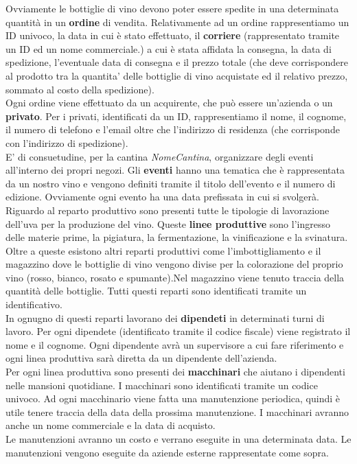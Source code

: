 Ovviamente le bottiglie di vino devono poter essere spedite in una determinata quantità in un \textbf{ordine} di vendita. Relativamente ad un ordine rappresentiamo un ID univoco, la data in cui è stato effettuato, il \textbf{corriere} (rappresentato tramite un ID ed un nome commerciale.) a cui è stata affidata la consegna, la data di spedizione, l'eventuale data di consegna e il prezzo totale (che deve corrispondere al prodotto tra la quantita' delle bottiglie di vino acquistate ed il relativo prezzo, sommato al costo della spedizione).\\
Ogni ordine viene effettuato da un acquirente, che può essere un'azienda o un \textbf{privato}. Per i privati, identificati da un ID, rappresentiamo il nome, il cognome, il numero di telefono e l'email oltre che l'indirizzo di residenza (che corrisponde con l'indirizzo di spedizione).\\
E' di consuetudine, per la cantina \emph{NomeCantina}, organizzare degli eventi all'interno dei propri negozi. Gli \textbf{eventi} hanno una tematica che è rappresentata da un nostro vino e vengono definiti tramite il titolo dell'evento e il numero di edizione. Ovviamente ogni evento ha una data prefissata in cui si svolgerà.
Riguardo al reparto produttivo sono presenti tutte le tipologie di lavorazione dell'uva per la produzione del vino. Queste \textbf{linee produttive} sono l'ingresso delle materie prime, la pigiatura, la fermentazione, la vinificazione e la svinatura. Oltre a queste esistono altri reparti produttivi come l'imbottigliamento e il magazzino dove le bottiglie di vino vengono divise per la colorazione del proprio vino (rosso, bianco, rosato e spumante).Nel magazzino viene tenuto traccia della quantità delle bottiglie. Tutti questi reparti sono identificati tramite un identificativo.\\
In ognugno di questi reparti lavorano dei \textbf{dipendeti} in determinati turni di lavoro. Per ogni dipendete (identificato tramite il codice fiscale) viene registrato il nome e il cognome. Ogni dipendente avrà un supervisore a cui fare riferimento e ogni linea produttiva sarà diretta da un dipendente dell'azienda.\\
Per ogni linea produttiva sono presenti dei \textbf{macchinari} che aiutano i dipendenti nelle mansioni quotidiane. I macchinari sono identificati tramite un codice univoco. Ad ogni macchinario viene fatta una manutenzione periodica, quindi è utile tenere traccia della data della prossima manutenzione. I macchinari avranno anche un nome commerciale e la data di acquisto.\\
Le manutenzioni avranno un costo e verrano eseguite in una determinata data. Le manutenzioni vengono eseguite da aziende esterne rappresentate come sopra.